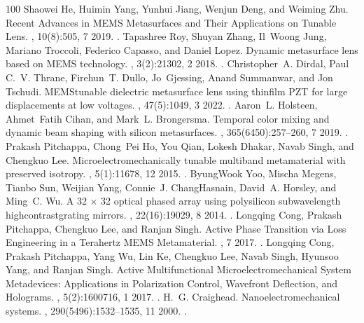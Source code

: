 \documentclass[a4paper,10pt,english,openany,oneside]{jupyterBook}
\begin{document}
\begin{sphinxthebibliography}{100}
\sphinxAtStartPar
Shaowei He, Huimin Yang, Yunhui Jiang, Wenjun Deng, and Weiming Zhu. Recent Advances in MEMS Metasurfaces and Their Applications on Tunable Lens. , 10(8):505, 7 2019. .
\sphinxAtStartPar
Tapashree Roy, Shuyan Zhang, Il Woong Jung, Mariano Troccoli, Federico Capasso, and Daniel Lopez. Dynamic metasurface lens based on MEMS technology. , 3(2):21302, 2 2018. .
\sphinxAtStartPar
Christopher A. Dirdal, Paul C. V. Thrane, Firehun T. Dullo, Jo Gjessing, Anand Summanwar, and Jon Tschudi. MEMS\sphinxhyphen{}tunable dielectric metasurface lens using thin\sphinxhyphen{}film PZT for large displacements at low voltages. , 47(5):1049, 3 2022. .
\sphinxAtStartPar
Aaron L. Holsteen, Ahmet Fatih Cihan, and Mark L. Brongersma. Temporal color mixing and dynamic beam shaping with silicon metasurfaces. , 365(6450):257–260, 7 2019. .
\sphinxAtStartPar
Prakash Pitchappa, Chong Pei Ho, You Qian, Lokesh Dhakar, Navab Singh, and Chengkuo Lee. Microelectromechanically tunable multiband metamaterial with preserved isotropy. , 5(1):11678, 12 2015. .
\sphinxAtStartPar
Byung\sphinxhyphen{}Wook Yoo, Mischa Megens, Tianbo Sun, Weijian Yang, Connie J. Chang\sphinxhyphen{}Hasnain, David A. Horsley, and Ming C. Wu. A 32 × 32 optical phased array using polysilicon sub\sphinxhyphen{}wavelength high\sphinxhyphen{}contrast\sphinxhyphen{}grating mirrors. , 22(16):19029, 8 2014. .
\sphinxAtStartPar
Longqing Cong, Prakash Pitchappa, Chengkuo Lee, and Ranjan Singh. Active Phase Transition via Loss Engineering in a Terahertz MEMS Metamaterial. , 7 2017. .
\sphinxAtStartPar
Longqing Cong, Prakash Pitchappa, Yang Wu, Lin Ke, Chengkuo Lee, Navab Singh, Hyunsoo Yang, and Ranjan Singh. Active Multifunctional Microelectromechanical System Metadevices: Applications in Polarization Control, Wavefront Deflection, and Holograms. , 5(2):1600716, 1 2017. .
\sphinxAtStartPar
H. G. Craighead. Nanoelectromechanical systems. , 290(5496):1532–1535, 11 2000. .
\end{sphinxthebibliography}







\renewcommand{\indexname}{Index}
\printindex
\end{document}
